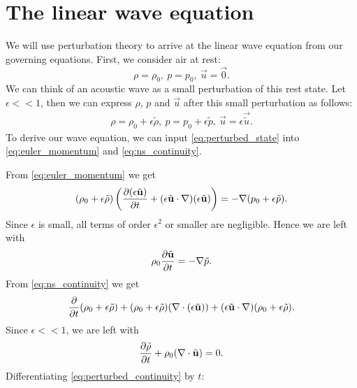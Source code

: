\section{The linear wave equation}\label{ss:perturbation}
We will use perturbation theory to arrive at the linear wave equation from our governing equations.
%
First, we consider air at rest:
  \[ \rho = \rho_0,~ p = p_0,~ \vec{u} = \vec{0}.
  \]
%
We can think of an acoustic wave as a small perturbation of this rest state. Let $\epsilon << 1$, then we can express $\rho$, $p$ and $\vec{u}$ after this small perturbation as follows:
  \begin{gather}\label{eq:perturbed_state}
    \rho = \rho_0 +\epsilon \tilde{\rho},~
    p = p_0 + \epsilon \tilde{p},~
    \vec{u} = \epsilon \vec{\tilde{u}}.
  \end{gather}
%
To derive our wave equation, we can input \eqref{eq:perturbed_state} into \eqref{eq:euler_momentum} and \eqref{eq:ns_continuity}. \par
%
From \eqref{eq:euler_momentum} we get
    \begin{equation*}
        (\rho_0 + \epsilon\tilde{\rho})
        \left(
        \frac{\partial (\epsilon \tilde{\mathbf{u}})}{\partial t} + (\epsilon\tilde{\mathbf{u}} \cdot \nabla)(\epsilon\tilde{\mathbf{u}})
        \right)
        = - \nabla (p_0 + \epsilon\tilde{p}).
    \end{equation*}
%
Since $\epsilon$ is small, all terms of order $\epsilon^2$ or smaller are negligible. Hence we are left with
    \begin{equation}\label{eq:perturbed_momentum}
        \rho_0 \frac{\partial \tilde{\mathbf{u}}}{\partial t} = - \nabla \tilde{p}.
    \end{equation}
%
From \eqref{eq:ns_continuity} we get
    \begin{equation*}
        \frac{\partial }{\partial t}(\rho_0 + \epsilon\tilde{\rho}) + (\rho_0 + \epsilon\tilde{\rho})(\nabla \cdot (\epsilon\tilde{\mathbf{u}})) + (\epsilon\tilde{\mathbf{u}} \cdot \nabla) (\rho_0 + \epsilon\tilde{\rho}).
    \end{equation*}
%
Since $\epsilon<<1$, we are left with
    \begin{equation}\label{eq:perturbed_continuity}
        \frac{\partial \tilde{\rho}}{\partial t} + \rho_0 (\nabla \cdot \tilde{\mathbf{u}}) = 0.
    \end{equation}
%
Differentiating \eqref{eq:perturbed_continuity} by $t$:
